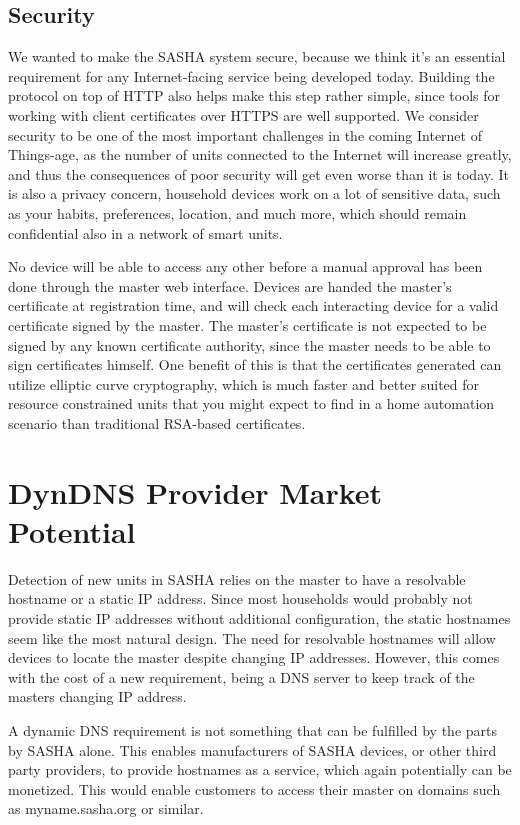 \subsection{Security}
We wanted to make the SASHA system secure, because we think it's an essential requirement for any Internet-facing service being developed today. Building the protocol on top of HTTP also helps make this step rather simple, since tools for working with client certificates over HTTPS are well supported. We consider security to be one of the most important challenges in the coming Internet of Things-age, as the number of units connected to the Internet will increase greatly, and thus the consequences of poor security will get even worse than it is today. It is also a privacy concern, household devices work on a lot of sensitive data, such as your habits, preferences, location, and much more, which should remain confidential also in a network of smart units.

No device will be able to access any other before a manual approval has been done through the master web interface. Devices are handed the master's certificate at registration time, and will check each interacting device for a valid certificate signed by the master. The master's certificate is not expected to be signed by any known certificate authority, since the master needs to be able to sign certificates himself. One benefit of this is that the certificates generated can utilize elliptic curve cryptography, which is much faster and better suited for resource constrained units that you might expect to find in a home automation scenario than traditional RSA-based certificates.

\section{DynDNS Provider Market Potential}
Detection of new units in SASHA relies on the master to have a resolvable hostname or a static IP address. Since most households would probably not provide static IP addresses without additional configuration, the static hostnames seem like the most natural design.
The need for resolvable hostnames will allow devices to locate the master despite changing IP addresses. However, this comes with the cost of a new requirement, being a DNS server to keep track of the masters changing IP address.

A dynamic DNS requirement is not something that can be fulfilled by the parts by SASHA alone. This enables manufacturers of SASHA devices, or other third party providers, to provide hostnames as a service, which again potentially can be monetized. This would enable customers to access their master on domains such as myname.sasha.org or similar.

